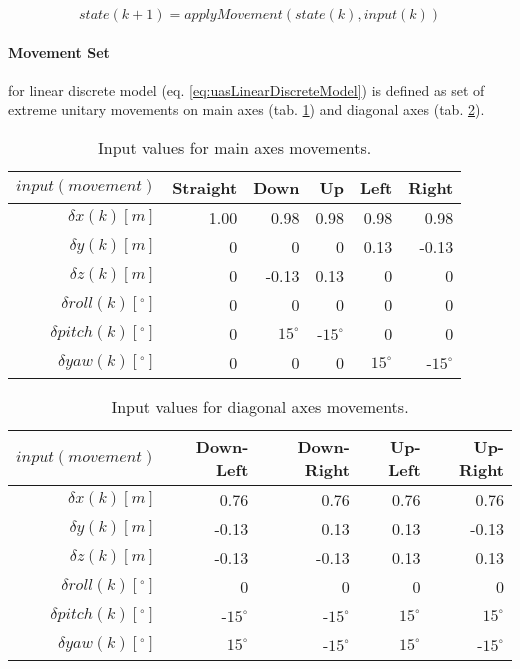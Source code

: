 \begin{equation}\label{eq:uasLinearDiscreteModel}
    state(k+1) = applyMovement(state(k), input(k)) 
\end{equation}

\paragraph{Movement Set} for linear discrete model (eq. \ref{eq:uasLinearDiscreteModel}) is defined as set of extreme unitary movements on main axes (tab. \ref{tab:movements1}) and diagonal axes (tab. \ref{tab:movements2}).

\begin{table}[H]
    \centering
    \begin{tabular}{r||r|r|r|r|r}
    
        $input(movement)$           &    Straight  & Down & Up & Left  & Right   \\\hline\hline
        $\delta     x(k)[m]$           &    1.00	  & 0.98  & 0.98  & 0.98 & 0.98  \\\hline
        $\delta     y(k)[m]$           &    0	      & 0	  & 0	  & 0.13 & -0.13 \\\hline
        $\delta     z(k)[m]$           &    0	      & -0.13 & 0.13  &	0	 & 0     \\\hline
        $\delta  roll(k) [^\circ]$	   &    0	      & 0	  & 0	  & 0    & 0     \\\hline
        $\delta pitch(k) [^\circ]$     &    0	      & $15^\circ$  & -$15^\circ$ & 0	 & 0     \\\hline
        $\delta   yaw(k) [^\circ]$     &    0	      & 0	  & 0	  & $15^\circ$ & -$15^\circ$ \\
    \end{tabular}
    \caption{Input values for main axes movements.}
    \label{tab:movements1}
\end{table}
\begin{table}[H]
    \centering
    \begin{tabular}{r||r|r|r|r}
        $input(movement)$             & Down-Left & Down-Right & Up-Left  & Up-Right   \\\hline\hline
        $\delta     x(k)[m]$           & 0.76  & 0.76  & 0.76 & 0.76  \\\hline
        $\delta     y(k)[m]$           & -0.13	& 0.13	& 0.13 & -0.13 \\\hline
        $\delta     z(k)[m]$           & -0.13 & -0.13 & 0.13 & 0.13  \\\hline
        $\delta  roll(k) [^\circ]$	& 0	    & 0	    & 0    & 0     \\\hline
        $\delta pitch(k) [^\circ]$     & -$15^\circ$ & -$15^\circ$ & $15^\circ$ & $15^\circ$     \\\hline
        $\delta   yaw(k) [^\circ]$    & $15^\circ$	& -$15^\circ$	& $15^\circ$ & -$15^\circ$ \\
    \end{tabular}
    \caption{Input values for diagonal axes movements.}
    \label{tab:movements2}
\end{table}


